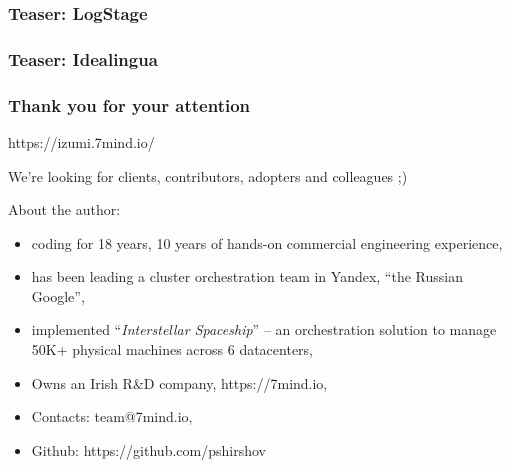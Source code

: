 \documentclass[usenames,dvipsnames]{beamer}
\begin{document}
\begin{frame}
\frametitle{Teaser: LogStage}
\end{frame}

\begin{frame}
\frametitle{Teaser: Idealingua}
\end{frame}


\begin{frame}
    \frametitle{Thank you for your attention}

    \begin{center}
      https://izumi.7mind.io/

      We're looking for clients, contributors, adopters and colleagues ;)
    \end{center}

    About the author:
    \begin{itemize}
        \item coding for 18 years, 10 years of hands-on commercial engineering experience,
        \item has been leading a cluster orchestration team in Yandex, ``the Russian Google'',
        \item implemented ``\textit{Interstellar Spaceship}'' -- an orchestration solution to manage 50K+ physical machines across 6 datacenters,
        \item Owns an Irish R\&D company, https://7mind.io,
        \item Contacts: team@7mind.io,
        \item Github: https://github.com/pshirshov
    \end{itemize}
\end{frame}
\end{document}
